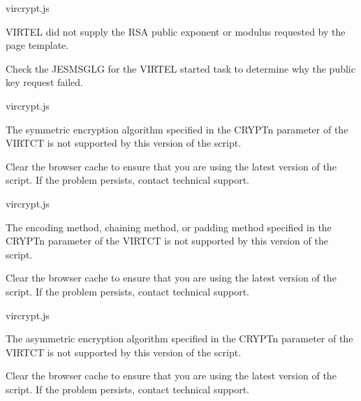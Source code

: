\documentclass[letterpaper,10pt,english]{sphinxmanual}
\begin{document}
\sphinxAtStartPar
{}
\begin{description}
\sphinxAtStartPar
vircrypt.js

\sphinxAtStartPar
VIRTEL did not supply the RSA public exponent or modulus requested by the page template.

\sphinxAtStartPar
Check the JESMSGLG for the VIRTEL started task to determine why the public key request failed.

\end{description}

\sphinxAtStartPar
{}
\begin{description}
\sphinxAtStartPar
vircrypt.js

\sphinxAtStartPar
The symmetric encryption algorithm specified in the CRYPTn parameter of the VIRTCT is not supported by this version of the script.

\sphinxAtStartPar
Clear the browser cache to ensure that you are using the latest version of the script. If the problem persists, contact technical support.

\end{description}

\sphinxAtStartPar
{}
\begin{description}
\sphinxAtStartPar
vircrypt.js

\sphinxAtStartPar
The encoding method, chaining method, or padding method specified in the CRYPTn parameter of the VIRTCT is not supported by this version of the script.

\sphinxAtStartPar
Clear the browser cache to ensure that you are using the latest version of the script. If the problem persists, contact technical support.

\end{description}

\sphinxAtStartPar
{}
\begin{description}
\sphinxAtStartPar
vircrypt.js

\sphinxAtStartPar
The asymmetric encryption algorithm specified in the CRYPTn parameter of the VIRTCT is not supported by this version of the script.

\sphinxAtStartPar
Clear the browser cache to ensure that you are using the latest version of the script. If the problem persists, contact technical support.

\end{description}
\end{document}
